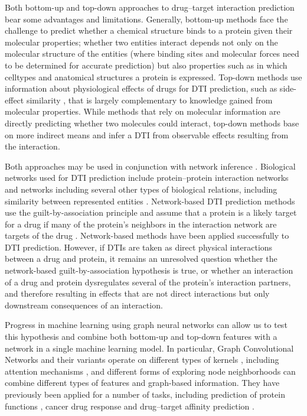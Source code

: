 \documentclass{bioinfo}
\renewcommand{\cite}{\citep}
\begin{document}
Both bottom-up and top-down approaches to drug--target interaction
prediction bear some advantages and limitations. Generally, bottom-up
methods face the challenge to predict whether a chemical structure
binds to a protein given their molecular properties; whether two
entities interact depends not only on the molecular structure of the
entities (where binding sites and molecular forces need to be
determined for accurate prediction) but also properties such as in
which celltypes and anatomical structures a protein is
expressed. Top-down methods use information about physiological
effects of drugs for DTI prediction, such as side-effect similarity
\cite{Campillos2008}, that is largely complementary to knowledge
gained from molecular properties. While methods that rely on molecular
information are directly predicting whether two molecules could
interact, top-down methods base on more indirect means and infer a DTI
from observable effects resulting from the interaction.

Both approaches may be used in conjunction with network inference
\cite{Chen2015}. Biological networks used for DTI prediction include
protein--protein interaction networks \cite{Feng2017, Lee2018} and
networks including several other types of biological relations,
including similarity between represented entities \cite{Ding2013,
  Gottlieb2011}. Network-based DTI prediction methods use the
guilt-by-association principle \cite{Oliver2000} and assume that a
protein is a likely target for a drug if many of the protein's
neighbors in the interaction network are targets of the drug
\cite{Gillis2012}. Network-based methods have been applied
successfully to DTI prediction. However, if DTIs are taken as direct
physical interactions between a drug and protein, it remains an
unresolved question whether the network-based guilt-by-association
hypothesis is true, or whether an interaction of a drug and protein
dysregulates several of the protein's interaction partners, and
therefore resulting in effects that are not direct interactions but
only downstream consequences of an interaction.

Progress in machine learning using graph neural networks can allow us
to test this hypothesis and combine both bottom-up and top-down
features with a network in a single machine learning model. 
In particular, Graph Convolutional Networks \cite{GCNConv} and
their variants operate on different types of kernels \cite{ChebConv,
  ARMAConv}, including attention mechanisms \cite{GATConv}, and
different forms of exploring node neighborhoods \cite{APPNPConv,
  SAGEConv} can combine different types of features and graph-based
information. %
They have previously been applied for a number of tasks, including
prediction of protein functions \cite{Zitnik2017}, cancer drug
response \cite{Liu2020} and drug--target affinity prediction
\cite{GraphDTA2020}.
\end{document}
